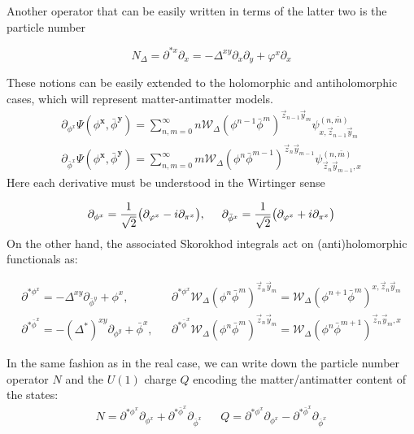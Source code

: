 \documentclass[12pt]{article}%
\begin{document}
Another operator that can be easily written in terms of the latter two is the particle number 

\begin{equation}
\label{eq:particleNumber}
N_{\Delta}=\partial^{*x}\partial_x=-\Delta^{xy}\partial_x\partial_y+\varphi^x\partial_x
\end{equation}

These notions can be easily extended to the holomorphic and antiholomorphic cases, which will represent matter-antimatter  models. 
\begin{gather}
\label{eq:holomorphicMalliavin}
\partial_{\phi^x}\Psi(\phi^{\mathbf{x}},\bar\phi^\mathbf{y})=\sum_{n,m=0}^\infty n\mathcal{W}_\Delta(\phi^{n-1}\bar{\phi}^m)^{\vec{z}_{n-1}\vec{y}_m}\psi^{(n,\bar{m})}_{x,\vec{z}_{n-1}\vec{y}_m} \\
\partial_{\bar\phi^x}\Psi(\phi^{\mathbf{x}},\bar\phi^\mathbf{y})=\sum_{n,m=0}^\infty m\mathcal{W}_\Delta(\phi^{n}\bar{\phi}^{m-1})^{\vec{z}_{n}\vec{y}_{m-1}}\psi^{(n,\bar{m})}_{\vec{z}_{n}\vec{y}_{m-1},x} 
\end{gather}
Here each derivative must be understood in the Wirtinger sense 

\begin{equation}
\label{eq:wirtinger}
\partial_{\phi^x}=\frac{1}{\sqrt{2}}\big(\partial_{\varphi^x}-i \partial_{\pi^x} \big),\hspace{0.5 cm} \partial_{\bar\phi^x}=\frac{1}{\sqrt{2}}\big(\partial_{\varphi^x}+i \partial_{\pi^x} \big)
\end{equation}
On the other hand, the associated Skorokhod integrals act on (anti)holomorphic functionals as: 

\begin{align}
\label{eq:holomorphicSkorokhod}
\partial^{*\phi^x} =-\Delta^{xy}\partial_{\bar\phi^y}+\phi^x, & &\partial^{*\phi^x}\mathcal{W}_\Delta(\phi^{n}\bar{\phi}^m)^{\vec{z}_{n}\vec{y}_m}= \mathcal{W}_\Delta(\phi^{n+1}\bar{\phi}^m)^{x,\vec{z}_{n}\vec{y}_m}\nonumber \\
\partial^{*\bar\phi^x} =-(\Delta^*)^{xy}\partial_{\phi^y}+\bar\phi^x, & &\partial^{*\bar\phi^x}\mathcal{W}_\Delta(\phi^{n}\bar{\phi}^m)^{\vec{z}_{n}\vec{y}_m}= \mathcal{W}_\Delta(\phi^{n}\bar{\phi}^{m+1})^{\vec{z}_{n}\vec{y}_m,x}
\end{align}

In the same fashion as in the real case, we can write down the particle number operator $N$ and the $U(1)$ charge $Q$ encoding the matter/antimatter content of the states:
\begin{align}
\label{eq:ChargeAndNumber}
    N=\partial^{*\phi^x}\partial_{\phi^x}+ \partial^{*\bar\phi^x}\partial_{\bar\phi^x} & & Q=\partial^{*\phi^x}\partial_{\phi^x}- \partial^{*\bar\phi^x}\partial_{\bar\phi^x}
\end{align}
\end{document}
